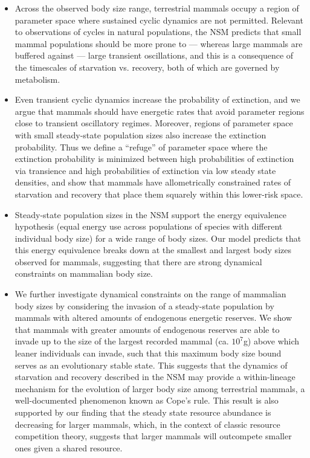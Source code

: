\documentclass[ucm,12pt]{ucletter}
\begin{document}
\begin{letter}
\begin{itemize}
  \item Across the observed body size range, terrestrial mammals occupy a region of parameter space where sustained cyclic dynamics are not permitted. Relevant to observations of cycles in natural populations, the NSM predicts  that small mammal populations should be more prone to — whereas large mammals are buffered against — large transient oscillations, and this is a consequence of the timescales of starvation vs. recovery, both of which are governed by metabolism.
  \item Even transient cyclic dynamics increase the probability of extinction, and we argue that mammals should have energetic rates that avoid parameter regions close to transient oscillatory regimes. Moreover, regions of parameter space with small steady-state population sizes also increase the extinction probability. Thus we define a ``refuge'' of parameter space where the extinction probability is minimized between high probabilities of extinction via transience and high probabilities of extinction via low steady state densities, and show that mammals have allometrically constrained rates of starvation and recovery that place them squarely within this lower-risk space.
  \item Steady-state population sizes in the NSM support the energy equivalence hypothesis (equal energy use across populations of species with different individual body size) for a wide range of body sizes. Our model predicts that this energy equivalence breaks down at the smallest and largest body sizes observed for mammals, suggesting that there are strong dynamical constraints on mammalian body size. 
  \item We further investigate dynamical constraints on the range of mammalian body sizes by considering the invasion of a steady-state population by mammals with altered amounts of endogenous energetic reserves. We show that mammals with greater amounts of endogenous reserves are able to invade up to the size of the largest recorded mammal (ca. $10^7$g) above which leaner individuals can invade, such that this maximum body size bound serves as an evolutionary stable state. This suggests that the dynamics of starvation and recovery described in the NSM may provide a within-lineage mechanism for the evolution of larger body size among terrestrial mammals, a well-documented phenomenon known as Cope’s rule. This result is also supported by our finding that the steady state resource abundance is decreasing for larger mammals, which, in the context of classic resource competition theory, suggests that larger mammals will outcompete smaller ones given a shared resource. 
\end{itemize}



\end{letter}
\end{document}
